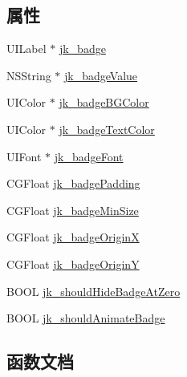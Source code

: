 \subsection*{属性}
\begin{DoxyCompactItemize}
\item 
U\+I\+Label $\ast$ \hyperlink{category_u_i_bar_button_item_07_j_k_badge_08_a88de29ebc8fe63b3ef018a18251be138}{jk\+\_\+badge}
\item 
N\+S\+String $\ast$ \hyperlink{category_u_i_bar_button_item_07_j_k_badge_08_aba1e56910940f680aef80eaebb5e8b54}{jk\+\_\+badge\+Value}
\item 
U\+I\+Color $\ast$ \hyperlink{category_u_i_bar_button_item_07_j_k_badge_08_af97abe18812537ead88be32022acafe0}{jk\+\_\+badge\+B\+G\+Color}
\item 
U\+I\+Color $\ast$ \hyperlink{category_u_i_bar_button_item_07_j_k_badge_08_ab49a412c6e2cf4e8be53c75268f21a20}{jk\+\_\+badge\+Text\+Color}
\item 
U\+I\+Font $\ast$ \hyperlink{category_u_i_bar_button_item_07_j_k_badge_08_a3153be7e31412fa6577cc68bc2f9c5e8}{jk\+\_\+badge\+Font}
\item 
C\+G\+Float \hyperlink{category_u_i_bar_button_item_07_j_k_badge_08_a6cd5dd012e9d7e48b7d12c13a0ed9abd}{jk\+\_\+badge\+Padding}
\item 
C\+G\+Float \hyperlink{category_u_i_bar_button_item_07_j_k_badge_08_a0af9fe453ac8b50cf5703df8a4e42ad1}{jk\+\_\+badge\+Min\+Size}
\item 
C\+G\+Float \hyperlink{category_u_i_bar_button_item_07_j_k_badge_08_ac4493f72159e5ae9d784276c23014097}{jk\+\_\+badge\+OriginX}
\item 
C\+G\+Float \hyperlink{category_u_i_bar_button_item_07_j_k_badge_08_a1fbeb46ac74c4e2438c372d4201c4c4d}{jk\+\_\+badge\+OriginY}
\item 
B\+O\+OL \hyperlink{category_u_i_bar_button_item_07_j_k_badge_08_aea988fd50af0f46b7f22e66819ee5c89}{jk\+\_\+should\+Hide\+Badge\+At\+Zero}
\item 
B\+O\+OL \hyperlink{category_u_i_bar_button_item_07_j_k_badge_08_ae9d595e20cb50093a8e5b313312d8fc9}{jk\+\_\+should\+Animate\+Badge}
\end{DoxyCompactItemize}


\subsection{函数文档}
\mbox{\label{category_u_i_bar_button_item_07_j_k_badge_08_ae88add47b43c72e9f217a365543c60aa}} 

